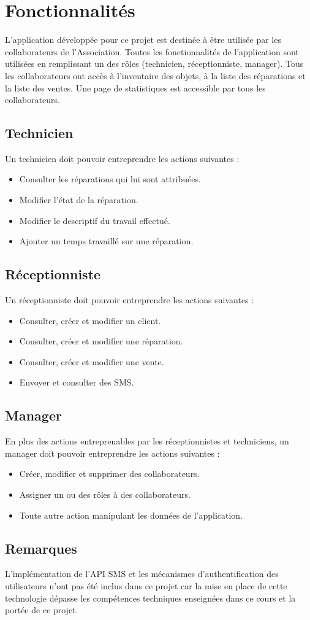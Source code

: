 \documentclass{article}
\begin{document}
\section{Fonctionnalités}
L'application développée pour ce projet est destinée à être utilisée par les collaborateurs de l'Association. Toutes les fonctionnalités de l'application sont utilisées en remplissant un des rôles (technicien, réceptionniste, manager). Tous les collaborateurs ont accès à l'inventaire des objets, à la liste des réparations et la liste des ventes. Une page de statistiques est accessible par tous les collaborateurs.

\subsection*{Technicien}
Un technicien doit pouvoir entreprendre les actions suivantes :
\begin{itemize}
    \item Consulter les réparations qui lui sont attribuées.
    \item Modifier l'état de la réparation.
    \item Modifier le descriptif du travail effectué.
    \item Ajouter un temps travaillé sur une réparation.
\end{itemize}

\subsection*{Réceptionniste}
Un réceptionniste doit pouvoir entreprendre les actions suivantes :
\begin{itemize}
    \item Consulter, créer et modifier un client.
    \item Consulter, créer et modifier une réparation.
    \item Consulter, créer et modifier une vente.
    \item Envoyer et consulter des SMS.
\end{itemize}

\subsection*{Manager}
En plus des actions entreprenables par les réceptionnistes et techniciens, un manager doit pouvoir entreprendre les actions suivantes :
\begin{itemize}
    \item Créer, modifier et supprimer des collaborateurs.
    \item Assigner un ou des rôles à des collaborateurs.
    \item Toute autre action manipulant les données de l'application.
\end{itemize}

\subsection*{Remarques}
L'implémentation de l'API SMS et les mécanismes d'authentification des utilisateurs n'ont pas été inclus dans ce projet car la mise en place de cette technologie dépasse les compétences techniques enseignées dans ce cours et la portée de ce projet.
\end{document}
